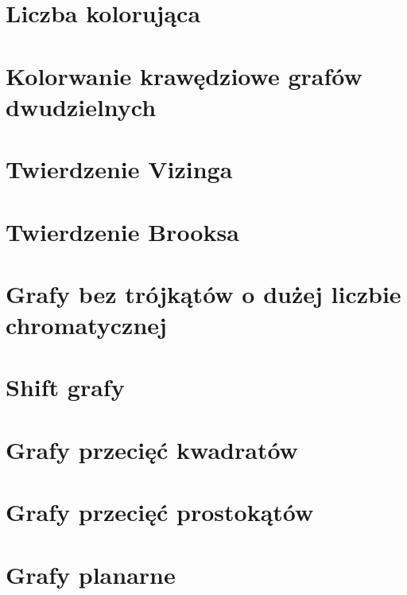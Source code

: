 \section{Liczba kolorująca}


\section{Kolorwanie krawędziowe grafów dwudzielnych}


\section{Twierdzenie Vizinga}


\section{Twierdzenie Brooksa}


\section{Grafy bez trójkątów o dużej liczbie chromatycznej}


\section{Shift grafy}


\section{Grafy przecięć kwadratów}




\section{Grafy przecięć prostokątów}



\section{Grafy planarne}

